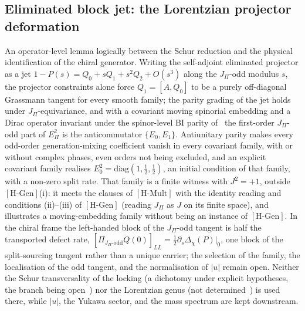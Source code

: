 \documentclass[11pt,a4paper]{article}
\theoremstyle{definition}
\newcommand{\Epi}{E_\Pi}
\newcommand{\HGen}{\ensuremath{[\mathrm{H\text{-}Gen}]}}
\newcommand{\HMult}{\ensuremath{[\mathrm{H\text{-}Mult}]}}
\begin{document}
    \subsection{Eliminated block jet: the Lorentzian projector deformation~\cite{Beau2026ebj}}
      An operator-level lemma logically between the Schur reduction and the physical identification of the chiral
      generator.
      Writing the self-adjoint eliminated projector as a jet $1-P(s)=Q_0+sQ_1+s^2Q_2+O(s^3)$ along the
      $J_\Pi$-odd modulus $s$, the projector constraints alone force $Q_1=[A,Q_0]$ to be a purely off-diagonal
      Grassmann tangent for every smooth family; the parity grading of the jet holds under $J_\Pi$-equivariance, and
      with a covariant moving spinorial embedding and a Dirac operator invariant under the spinor-level BI parity
      of~\cite{Beau2026ebj} the first-order $J_\Pi$-odd part
      of $\Epi^2$ is the anticommutator $\{E_0,E_1\}$.
      Antiunitary parity makes every odd-order generation-mixing coefficient vanish in every covariant family, with or
      without complex phases, even orders not being excluded, and an explicit covariant family realises
      $E_0^2=\mathrm{diag}(1,\tfrac12,\tfrac12)$, an initial condition of that family, with a non-zero split rate.
      That family is a finite witness with $J^2=+1$, outside \HGen{}(i): it meets the clauses of \HMult{} with the
      identity reading and conditions (ii)--(iii) of \HGen{} (reading $J_\Pi$ as $J$ on its finite space), and
      illustrates a moving-embedding family without being an instance of \HGen{}.
      In the chiral frame the left-handed block of the $J_\Pi$-odd tangent is half the transported defect rate,
      $[\Pi_{J_\Pi\text{-odd}}\dot Q(0)]_{LL}=\tfrac12\partial_s\Delta_\chi(P)|_0$, one block of the split-sourcing
      tangent rather than a unique carrier; the selection of the family, the localisation of the odd tangent, and the
      normalisation of $|u|$ remain open.
      Neither the Schur transversality of the locking (a dichotomy under explicit hypotheses, the branch being
      open~\cite{Beau2026prs}) nor the Lorentzian genus (not determined~\cite{Beau2026bim}) is used there, while
      $|u|$, the Yukawa sector, and the mass spectrum are kept downstream.
\end{document}
